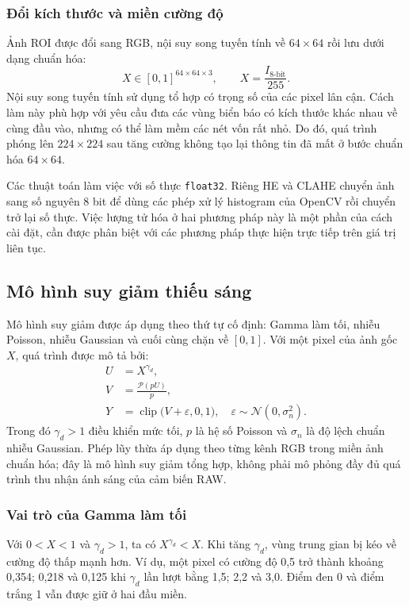 \subsubsection{Đổi kích thước và miền cường độ}
Ảnh ROI được đổi sang RGB, nội suy song tuyến tính về $64\times64$ rồi lưu dưới dạng chuẩn hóa:
\begin{equation}
X\in[0,1]^{64\times64\times3},\qquad X=\frac{I_{8\text{-bit}}}{255}.
\end{equation}
Nội suy song tuyến tính sử dụng tổ hợp có trọng số của các pixel lân cận. Cách làm này phù hợp với yêu cầu đưa các vùng biển báo có kích thước khác nhau về cùng đầu vào, nhưng có thể làm mềm các nét vốn rất nhỏ. Do đó, quá trình phóng lên $224\times224$ sau tăng cường không tạo lại thông tin đã mất ở bước chuẩn hóa $64\times64$.

Các thuật toán làm việc với số thực \texttt{float32}. Riêng HE và CLAHE chuyển ảnh sang số nguyên 8 bit để dùng các phép xử lý histogram của OpenCV rồi chuyển trở lại số thực. Việc lượng tử hóa ở hai phương pháp này là một phần của cách cài đặt, cần được phân biệt với các phương pháp thực hiện trực tiếp trên giá trị liên tục.

\subsection{Mô hình suy giảm thiếu sáng}
Mô hình suy giảm được áp dụng theo thứ tự cố định: Gamma làm tối, nhiễu Poisson, nhiễu Gaussian và cuối cùng chặn về $[0,1]$. Với một pixel của ảnh gốc $X$, quá trình được mô tả bởi:
\begin{align}
U &= X^{\gamma_d},\label{eq:dark}\\
V &= \frac{\mathcal{P}(pU)}{p},\label{eq:poisson}\\
Y &= \operatorname{clip}\bigl(V+\varepsilon,0,1\bigr),\quad
\varepsilon\sim\mathcal{N}(0,\sigma_n^2).\label{eq:degradation}
\end{align}
Trong đó $\gamma_d>1$ điều khiển mức tối, $p$ là hệ số Poisson và $\sigma_n$ là độ lệch chuẩn nhiễu Gaussian. Phép lũy thừa áp dụng theo từng kênh RGB trong miền ảnh chuẩn hóa; đây là mô hình suy giảm tổng hợp, không phải mô phỏng đầy đủ quá trình thu nhận ánh sáng của cảm biến RAW.

\subsubsection{Vai trò của Gamma làm tối}
Với $0<X<1$ và $\gamma_d>1$, ta có $X^{\gamma_d}<X$. Khi tăng $\gamma_d$, vùng trung gian bị kéo về cường độ thấp mạnh hơn. Ví dụ, một pixel có cường độ 0,5 trở thành khoảng 0,354; 0,218 và 0,125 khi $\gamma_d$ lần lượt bằng 1,5; 2,2 và 3,0. Điểm đen 0 và điểm trắng 1 vẫn được giữ ở hai đầu miền.

